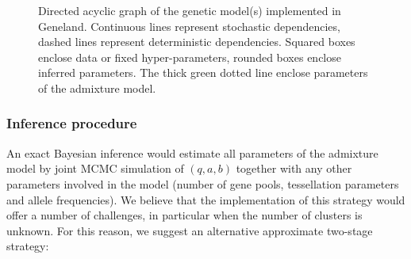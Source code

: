 \documentclass{article}
\begin{document}

\begin{figure}[h]
\centerline{}
\caption{Directed acyclic graph of the genetic model(s) implemented in {\sc Geneland}. 
Continuous lines represent stochastic dependencies, dashed lines represent 
deterministic dependencies. Squared boxes enclose data or fixed hyper-parameters, rounded boxes enclose inferred parameters. 
The thick green dotted line enclose parameters of the admixture model. }\label{fig:dag}
\end{figure}


\subsubsection{Inference  procedure}
An exact Bayesian inference would estimate all parameters of the admixture model 
by joint MCMC simulation of $(q,a,b)$ together with any other parameters involved in the model 
(number of gene pools, tessellation parameters and allele frequencies). 
We believe that the implementation of this strategy would offer a number of challenges, in particular when the number of clusters is unknown. 
For this reason, we suggest an alternative approximate two-stage strategy:
\end{document}
